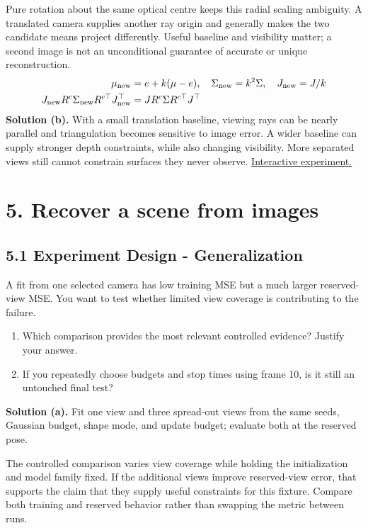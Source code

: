 \documentclass[11pt,a4paper]{article}
\begin{document}
Pure rotation about the same optical centre keeps this radial scaling ambiguity.
A translated camera supplies another ray origin and generally makes the two candidate means project differently.
Useful baseline and visibility matter; a second image is not an unconditional guarantee of accurate or unique reconstruction.
\[
\begin{aligned}\mu_{\rm new}&=e+k(\mu-e),\quad\Sigma_{\rm new}=k^2\Sigma,\quad J_{\rm new}=J/k\\J_{\rm new}R^c\Sigma_{\rm new}R^{c\top}J_{\rm new}^\top&=JR^c\Sigma R^{c\top}J^\top\end{aligned}
\]
\noindent\textbf{Solution (b).} With a small translation baseline, viewing rays can be nearly parallel and triangulation becomes sensitive to image error.
A wider baseline can supply stronger depth constraints, while also changing visibility.
More separated views still cannot constrain surfaces they never observe.
\noindent\href{https://sosekie.github.io/Unibe-CVG-CV-Interactive-Labs/tutorial-09/#colour}{Interactive experiment.}
\par{}\section*{5. Recover a scene from images}
\subsection*{5.1 Experiment Design - Generalization}
A fit from one selected camera has low training MSE but a much larger reserved-view MSE.
You want to test whether limited view coverage is contributing to the failure.
\begin{enumerate}[label=(\alph*),nosep]
\item Which comparison provides the most relevant controlled evidence?
Justify your answer.
\item If you repeatedly choose budgets and stop times using frame 10, is it still an untouched final test?
\end{enumerate}
\noindent\textbf{Solution (a).} Fit one view and three spread-out views from the same seeds, Gaussian budget, shape mode, and update budget; evaluate both at the reserved pose.

The controlled comparison varies view coverage while holding the initialization and model family fixed.
If the additional views improve reserved-view error, that supports the claim that they supply useful constraints for this fixture.
Compare both training and reserved behavior rather than swapping the metric between runs.
\end{document}
